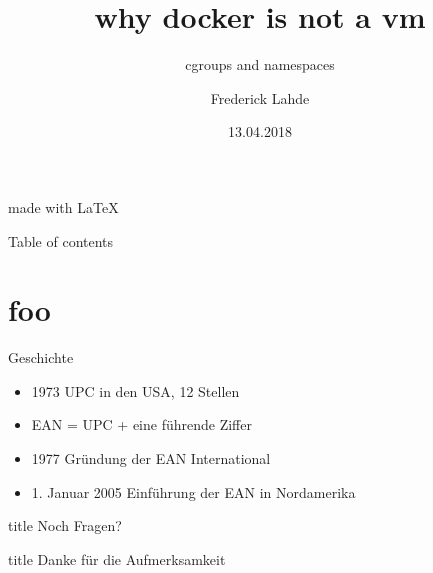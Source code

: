 \documentclass[14pt]{beamer}
\author{
    Frederick Lahde
  }
\title[]{why docker is not a vm}
\subtitle{cgroups and namespaces}
\institute{Hochschule Emden/Leer}
\date{13.04.2018}
\begin{document}
    \begin{frame}[plain]
      \maketitle
      \centering
      \begin{figure}[H]
      \end{figure}
      \tiny{made with \LaTeX}
    \end{frame}
  
    \begin{frame}{Table of contents}
      \setcounter{tocdepth}{1}
      \tableofcontents
    \end{frame}
  

    \section{foo}
    \begin{frame}{Geschichte}
      \begin{itemize}
        \item 1973 UPC in den USA, 12 Stellen
        \item EAN = UPC + eine führende Ziffer
        \item 1977 Gründung der EAN International
        \item 1. Januar 2005 Einführung der EAN in Nordamerika
      \end{itemize}
    \end{frame}
    


    \begin{frame}
      \vfill
      \centering
      \begin{beamercolorbox}[sep=8pt,center,shadow=true,rounded=true]{title}
        Noch Fragen?
      \end{beamercolorbox}
      \vfill
    \end{frame}
  
    \begin{frame}
      \vfill
      \centering
      \begin{beamercolorbox}[sep=8pt,center,shadow=true,rounded=true]{title}
        Danke für die Aufmerksamkeit
      \end{beamercolorbox}
      \vfill
    \end{frame}
  
\end{document}
